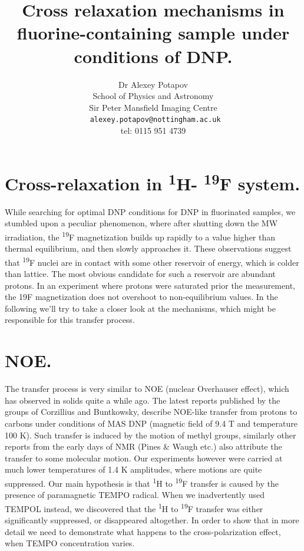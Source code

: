 \documentclass[a4paper, 12pt]{article}
\begin{document}
\title{Cross relaxation mechanisms in fluorine-containing sample under conditions of DNP.}
\author{Dr Alexey Potapov\\
School of Physics and Astronomy\\
Sir Peter Mansfield Imaging Centre \\
\texttt{ alexey.potapov@nottingham.ac.uk}\\
tel: 0115 951 4739 }
\maketitle
 
\doublespacing
 
\section{Cross-relaxation in \textsuperscript{1}H- \textsuperscript{19}F system.}
While searching for optimal DNP conditions for DNP in fluorinated samples, we stumbled upon a peculiar phenomenon, where after shutting down the MW irradiation, the \textsuperscript{19}F magnetization builds up rapidly to a value higher than thermal equilibrium, and then slowly approaches it. These observations suggest that \textsuperscript{19}F nuclei are in contact with some other reservoir of energy, which is colder than lattice. The most obvious candidate for such a reservoir are abundant protons. In an experiment where protons were saturated prior the measurement, the 19F magnetization does not overshoot to non-equilibrium values. In the following we'll try to take a closer look at the mechanisms, which might be responsible for this transfer process.
\section{NOE.}
The transfer process is very similar to NOE (nuclear Overhauser effect), which has observed in solids quite a while ago. The latest reports published by the groups of Corzillius and Buntkowsky, describe NOE-like transfer from protons to carbons under conditions of MAS DNP (magnetic field of 9.4 T and temperature 100 K). Such transfer is induced by the motion of methyl groups, similarly other reports from the early days of NMR (Pines \& Waugh etc.) also attribute the transfer to some molecular motion. Our experiments however were carried at much lower temperatures of 1.4 K amplitudes, where motions are quite suppressed. 
Our main hypothesis is that \textsuperscript{1}H to \textsuperscript{19}F transfer is caused by the presence of paramagnetic TEMPO radical. When we inadvertently used  TEMPOL instead, we discovered that the \textsuperscript{1}H to \textsuperscript{19}F transfer was either significantly suppressed, or disappeared altogether. In order to show that in more detail we need to demonstrate what happens to the cross-polarization effect, when TEMPO concentration varies.
\end{document}
